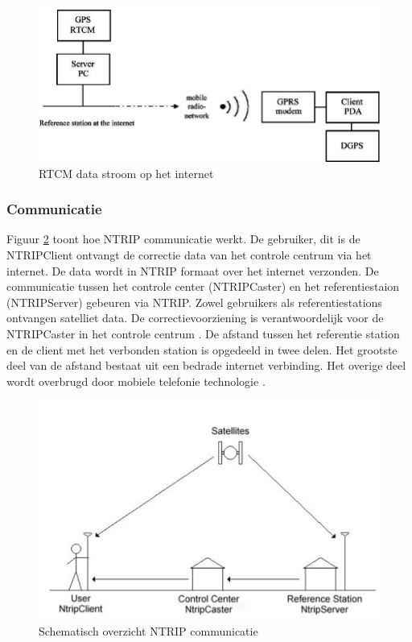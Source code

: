 \begin{figure}[hpb]
	\includegraphics[scale=0.4]{NTRIP2.png}
	\caption{RTCM data stroom op het internet \cite{LBibNTRIP2}}
	\label{imgNTRIP2}
\end{figure} 

\subsubsection{Communicatie}
Figuur \ref{imgNTRIPCom} toont hoe NTRIP communicatie werkt. De gebruiker, dit is de NTRIPClient ontvangt de correctie data van het controle centrum via het internet. De data wordt in NTRIP formaat over het internet verzonden. De communicatie tussen het controle center (NTRIPCaster) en het referentiestaion (NTRIPServer) gebeuren via NTRIP. Zowel gebruikers als referentiestations ontvangen satelliet data. De correctievoorziening is verantwoordelijk voor de NTRIPCaster in het controle centrum \cite{LBibNTRIP4}. De afstand tussen het referentie station en de client met het verbonden station is opgedeeld in twee delen. Het grootste deel van de afstand bestaat uit een bedrade internet verbinding. Het overige deel wordt overbrugd door mobiele telefonie technologie \cite{LBibNTRIP2}.

\begin{figure}[hpb]
	\includegraphics[scale=0.55]{NTRIPCommunication.png}
	\caption{Schematisch overzicht NTRIP communicatie \cite{LBibNTRIP4}}
	\label{imgNTRIPCom}
\end{figure}

